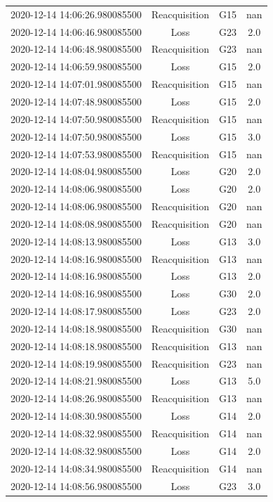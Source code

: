 \begin{enumerate}
\begin{longtabu}{cccc}
2020{-}12{-}14 14:06:26.980085500&Reacquisition&G15&nan\\%
2020{-}12{-}14 14:06:46.980085500&Loss&G23&2.0\\%
2020{-}12{-}14 14:06:48.980085500&Reacquisition&G23&nan\\%
2020{-}12{-}14 14:06:59.980085500&Loss&G15&2.0\\%
2020{-}12{-}14 14:07:01.980085500&Reacquisition&G15&nan\\%
2020{-}12{-}14 14:07:48.980085500&Loss&G15&2.0\\%
2020{-}12{-}14 14:07:50.980085500&Reacquisition&G15&nan\\%
2020{-}12{-}14 14:07:50.980085500&Loss&G15&3.0\\%
2020{-}12{-}14 14:07:53.980085500&Reacquisition&G15&nan\\%
2020{-}12{-}14 14:08:04.980085500&Loss&G20&2.0\\%
2020{-}12{-}14 14:08:06.980085500&Loss&G20&2.0\\%
2020{-}12{-}14 14:08:06.980085500&Reacquisition&G20&nan\\%
2020{-}12{-}14 14:08:08.980085500&Reacquisition&G20&nan\\%
2020{-}12{-}14 14:08:13.980085500&Loss&G13&3.0\\%
2020{-}12{-}14 14:08:16.980085500&Reacquisition&G13&nan\\%
2020{-}12{-}14 14:08:16.980085500&Loss&G13&2.0\\%
2020{-}12{-}14 14:08:16.980085500&Loss&G30&2.0\\%
2020{-}12{-}14 14:08:17.980085500&Loss&G23&2.0\\%
2020{-}12{-}14 14:08:18.980085500&Reacquisition&G30&nan\\%
2020{-}12{-}14 14:08:18.980085500&Reacquisition&G13&nan\\%
2020{-}12{-}14 14:08:19.980085500&Reacquisition&G23&nan\\%
2020{-}12{-}14 14:08:21.980085500&Loss&G13&5.0\\%
2020{-}12{-}14 14:08:26.980085500&Reacquisition&G13&nan\\%
2020{-}12{-}14 14:08:30.980085500&Loss&G14&2.0\\%
2020{-}12{-}14 14:08:32.980085500&Reacquisition&G14&nan\\%
2020{-}12{-}14 14:08:32.980085500&Loss&G14&2.0\\%
2020{-}12{-}14 14:08:34.980085500&Reacquisition&G14&nan\\%
2020{-}12{-}14 14:08:56.980085500&Loss&G23&3.0\\%

\end{longtabu}
\end{enumerate}
